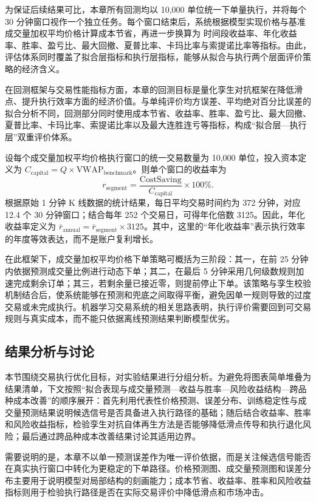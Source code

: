 为保证后续结果可比，本章所有回测均以 10,000 单位统一下单量执行，并将每个 30 分钟窗口视作一个独立任务。每个窗口结束后，系统根据模型实现价格与基准成交量加权平均价格计算成本节省，再进一步换算为 时间段收益率、年化收益率、胜率、盈亏比、最大回撤、夏普比率、卡玛比率与索提诺比率等指标。由此，评估体系同时覆盖了拟合层指标和执行层指标，能够从拟合与执行两个层面评价策略的经济含义。

在回测框架与交易性能指标方面，本章的回测目标是量化孪生对抗框架在降低滑点、提升执行效率方面的经济价值。与单纯评价均方误差、平均绝对百分比误差的拟合分析不同，回测部分同时使用成本节省、收益率、胜率、盈亏比、最大回撤、夏普比率、卡玛比率、索提诺比率以及最大连胜连亏等指标，构成“拟合层—执行层”双重评价体系。

设每个成交量加权平均价格执行窗口的统一交易数量为 10,000 单位，投入资本定义为 $C_{\text{capital}} = Q \times \text{VWAP}_{\text{benchmark}}$。则单个窗口的收益率为
\begin{equation}
r_{\text{segment}} = \frac{\text{CostSaving}}{C_{\text{capital}}} \times 100\%.
\end{equation}
根据原始 1 分钟 K 线数据的统计结果，每日平均交易时间约为 372 分钟，对应 12.4 个 30 分钟窗口；结合每年 252 个交易日，可得年化倍数 3125。因此，年化收益率定义为 $\bar r_{\text{annual}} = \bar r_{\text{segment}} \times 3125$。其中，这里的“年化收益率”表示执行效率的年度等效表达，而不是账户复利增长。

在此框架下，成交量加权平均价格下单策略可概括为三阶段：其一，在前 25 分钟内依据预测成交量比例进行动态下单；其二，在最后 5 分钟采用几何级数规则加速完成剩余订单；其三，若剩余量已接近零，则提前停止下单。该策略与孪生校验机制结合后，使系统能够在预测和兜底之间取得平衡，避免因单一规则导致的过度交易或未完成执行。机器学习交易系统的相关思路表明，执行评价需要回到可交易规则与真实成本，而不能只依据离线预测结果判断模型优劣。

\subsection{结果分析与讨论}

本节围绕交易执行优化目标，对实验结果进行分组分析。为避免将图表简单堆叠为结果清单，下文按照“拟合表现与成交量预测—收益与胜率—风险收益结构—跨品种成本改善”的顺序展开：首先利用代表性价格预测、误差分布、训练稳定性与成交量预测结果说明候选信号是否具备进入执行路径的基础；随后结合收益率、胜率和风险收益指标，检验孪生对抗自体再生方法是否能够降低滑点传导和执行退化风险；最后通过跨品种成本改善结果讨论其适用边界。

需要说明的是，本章不以单一预测误差作为唯一评价依据，而是关注候选信号能否在真实执行窗口中转化为更稳定的下单路径。价格预测图、成交量预测图和误差分布主要用于说明模型对局部结构的刻画能力；成本节省、收益率、胜率和风险收益指标则用于检验执行路径是否在实际交易评价中降低滑点和市场冲击。

